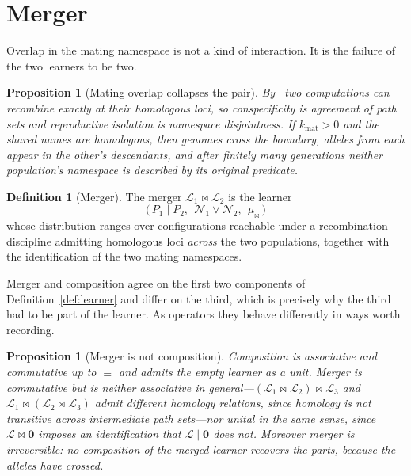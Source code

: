 \documentclass[11pt,a4paper]{article}
\theoremstyle{plain}
\newtheorem{proposition}[theorem]{Proposition}
\theoremstyle{definition}
\newtheorem{definition}[theorem]{Definition}
\theoremstyle{remark}
\newcommand{\Lrn}{\mathcal{L}}
\newcommand{\Nsp}{\mathcal{N}}
\newcommand{\Merge}{\bowtie}
\begin{document}
\section{Merger}\label{sec:merger}

Overlap in the mating namespace is not a kind of interaction. It is the failure of the two
learners to be two.

\begin{proposition}[Mating overlap collapses the pair]
By~\cite[Prop.~53]{scientist} two computations can recombine exactly at their homologous loci, so
conspecificity is agreement of path sets and reproductive isolation is namespace disjointness. If
$k_{\mathrm{mat}} > 0$ and the shared names are homologous, then genomes cross the boundary,
alleles from each appear in the other's descendants, and after finitely many generations neither
population's namespace is described by its original predicate.
\end{proposition}

\begin{definition}[Merger]\label{def:merger}
The merger $\Lrn_1 \Merge \Lrn_2$ is the learner
\[
  \bigl(\,P_1 \mid P_2,\ \ \Nsp_1 \vee \Nsp_2,\ \ \mu_{\Merge}\,\bigr)
\]
whose distribution ranges over configurations reachable under a recombination discipline admitting
homologous loci \emph{across} the two populations, together with the identification of the two
mating namespaces.
\end{definition}

Merger and composition agree on the first two components of Definition~\ref{def:learner} and
differ on the third, which is precisely why the third had to be part of the learner. As operators
they behave differently in ways worth recording.

\begin{proposition}[Merger is not composition]
Composition is associative and commutative up to $\equiv$ and admits the empty learner as a unit.
Merger is commutative but is neither associative in general---$(\Lrn_1 \Merge \Lrn_2) \Merge
\Lrn_3$ and $\Lrn_1 \Merge (\Lrn_2 \Merge \Lrn_3)$ admit different homology relations, since
homology is not transitive across intermediate path sets---nor unital in the same sense, since
$\Lrn \Merge \mathbf{0}$ imposes an identification that $\Lrn \mid \mathbf{0}$ does not.
Moreover merger is irreversible: no composition of the merged learner recovers the parts, because
the alleles have crossed.
\end{proposition}
\end{document}
